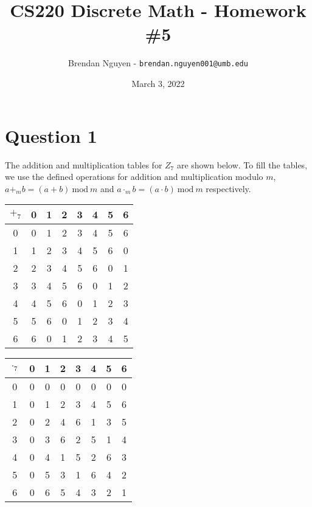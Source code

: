 \documentclass[11pt]{article}
\title{CS220 Discrete Math - Homework \#5}
\author{Brendan Nguyen - \texttt{brendan.nguyen001@umb.edu}}
\date{March 3, 2022}
\newcommand{\Mod}[1]{\ \mathrm{mod}\ #1}
\begin{document}
\maketitle

\section*{Question 1}

The addition and multiplication tables for $Z_7$ are shown below. To fill the tables, we use the defined operations for addition and multiplication modulo $m$, $a +_m b = (a+b) \Mod{m}$ and $a \cdot_m b = (a \cdot b) \Mod{m}$ respectively.

\begin{multicols}{2}
    \begin{table}[H]
        \begin{tabular}{c|c c c c c c c}
             $+_7$ & 0 & 1 & 2 & 3 & 4 & 5 & 6\\
             \hline
             0 & 0 & 1 & 2 & 3 & 4 & 5 & 6\\
             1 & 1 & 2 & 3 & 4 & 5 & 6 & 0\\
             2 & 2 & 3 & 4 & 5 & 6 & 0 & 1\\
             3 & 3 & 4 & 5 & 6 & 0 & 1 & 2\\
             4 & 4 & 5 & 6 & 0 & 1 & 2 & 3\\
             5 & 5 & 6 & 0 & 1 & 2 & 3 & 4\\
             6 & 6 & 0 & 1 & 2 & 3 & 4 & 5\\
        \end{tabular}
    \end{table}
    
    \begin{table}[H]
        \begin{tabular}{c|c c c c c c c}
             $\cdot_7$ & 0 & 1 & 2 & 3 & 4 & 5 & 6\\
             \hline
             0 & 0 & 0 & 0 & 0 & 0 & 0 & 0\\
             1 & 0 & 1 & 2 & 3 & 4 & 5 & 6\\
             2 & 0 & 2 & 4 & 6 & 1 & 3 & 5\\
             3 & 0 & 3 & 6 & 2 & 5 & 1 & 4\\
             4 & 0 & 4 & 1 & 5 & 2 & 6 & 3\\
             5 & 0 & 5 & 3 & 1 & 6 & 4 & 2\\
             6 & 0 & 6 & 5 & 4 & 3 & 2 & 1\\
        \end{tabular}
    \end{table}
\end{multicols}
\end{document}
